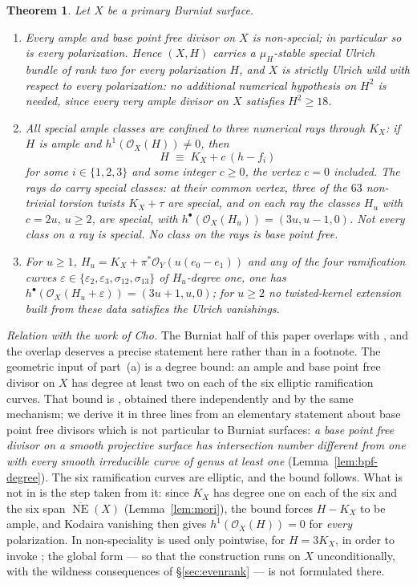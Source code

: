 \documentclass[10pt,a4paper]{amsart}
\newtheorem{theorem}{Theorem}[section]
\newcommand{\OO}{\mathcal{O}}
\newcommand{\NE}{\overline{\operatorname{NE}}}
\begin{document}
\begin{theorem}\label{thm:burniat}
Let $X$ be a primary Burniat surface.
\begin{enumerate}[label=\textup{(\alph*)}]
\item \emph{Every} ample and base point free divisor on $X$ is non-special; in particular so is every polarization. Hence $(X,H)$ carries a $\mu_H$-stable special Ulrich bundle of rank two for every polarization $H$, and $X$ is strictly Ulrich wild with respect to \emph{every} polarization: no additional numerical hypothesis on $H^2$ is needed, since every very ample divisor on $X$ satisfies $H^2\ge18$.
\item All special ample classes are confined to three numerical rays through $K_X$: if $H$ is ample and $h^1(\OO_X(H))\neq0$, then
\[
H\;\equiv\;K_X+c\,(h-f_i)
\]
for some $i\in\{1,2,3\}$ and some integer $c\ge0$, the vertex $c=0$ included. The rays do carry special classes: at their common vertex, three of the $63$ non-trivial torsion twists $K_X+\tau$ are special, and on each ray the classes $H_u$ with $c=2u$, $u\ge2$, are special, with $h^\bullet(\OO_X(H_u))=(3u,u-1,0)$. Not every class on a ray is special. No class on the rays is base point free.
\item For $u\ge1$, $H_u=K_X+\pi^*\OO_Y(u(e_0-e_1))$ and any of the four ramification curves $\varepsilon\in\{\varepsilon_2,\varepsilon_3,\sigma_{12},\sigma_{13}\}$ of $H_u$-degree one, one has $h^\bullet(\OO_X(H_u+\varepsilon))=(3u+1,u,0)$; for $u\ge2$ no twisted-kernel extension built from these data satisfies the Ulrich vanishings.
\end{enumerate}
\end{theorem}

\smallskip
\noindent\emph{Relation with the work of Cho.} The Burniat half of this paper overlaps with \cite{Cho26}, and the overlap deserves a precise statement here rather than in a footnote. The geometric input of part~(a) is a degree bound: an ample and base point free divisor on $X$ has degree at least two on each of the six elliptic ramification curves. That bound is \cite[Prop.~5.4]{Cho26}, obtained there independently and by the same mechanism; we derive it in three lines from an elementary statement about base point free divisors which is not particular to Burniat surfaces: \emph{a base point free divisor on a smooth projective surface has intersection number different from one with every smooth irreducible curve of genus at least one} (Lemma~\ref{lem:bpf-degree}). The six ramification curves are elliptic, and the bound follows. What is not in \cite{Cho26} is the step taken from it: since $K_X$ has degree one on each of the six and the six span $\NE(X)$ (Lemma~\ref{lem:mori}), the bound forces $H-K_X$ to be ample, and Kodaira vanishing then gives $h^1(\OO_X(H))=0$ for \emph{every} polarization. In \cite{Cho26} non-speciality is used only pointwise, for $H=3K_X$, in order to invoke \cite{Cas17}; the global form --- so that the construction runs on $X$ unconditionally, with the wildness consequences of \S\ref{sec:evenrank} --- is not formulated there.
\end{document}
